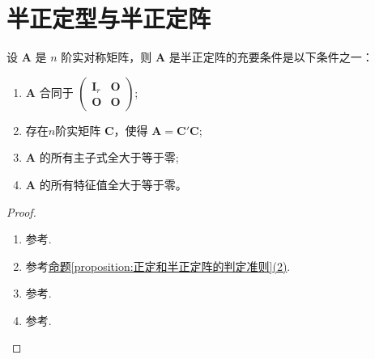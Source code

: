 \documentclass[../../main.tex]{subfiles}%
\begin{document}
\section{半正定型与半正定阵}

\begin{proposition}\label{proposition:半正定阵的判定准则123}
设 \(\boldsymbol{A}\) 是 \(n\) 阶实对称矩阵，则 \(\boldsymbol{A}\) 是半正定阵的充要条件是以下条件之一：
\begin{enumerate}[(1)]
\item \(\boldsymbol{A}\) 合同于 \(\begin{pmatrix}\boldsymbol{I}_r&\boldsymbol{O}\\\boldsymbol{O}&\boldsymbol{O}\end{pmatrix}\);

\item 存在$n$阶实矩阵 \(\boldsymbol{C}\)，使得 \(\boldsymbol{A}=\boldsymbol{C}'\boldsymbol{C}\);

\item \(\boldsymbol{A}\) 的所有主子式全大于等于零;

\item \(\boldsymbol{A}\) 的所有特征值全大于等于零。
\end{enumerate}
\end{proposition}
\begin{proof}
\begin{enumerate}[(1)]
\item 参考.

\item 参考\hyperref[proposition:正定和半正定阵的判定准则]{命题\ref{proposition:正定和半正定阵的判定准则}(2)}.

\item 参考.

\item 参考.
\end{enumerate}
\end{proof}
\end{document}
